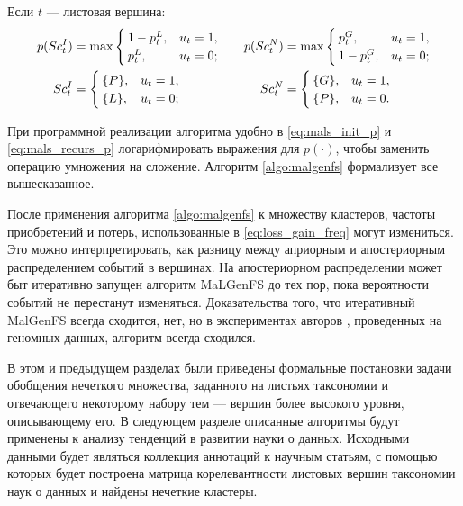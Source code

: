 \documentclass[12pt]{article}
\newenvironment{itemize*}%
{\begin{itemize}%
	\setlength{\itemsep}{0pt}%
	\setlength{\parskip}{0pt}}%
{\end{itemize}}
\begin{document}
\begin{itemize*}
 	\item Если $t$ --- листовая вершина:
 	\begin{equation}
 		\begin{aligned}
			p(Sc_t^I)&=\max\begin{cases}
			1-p_t^L, &u_t=1, \\
			p_t^L, &u_t=0;
			\end{cases}  \quad
			&p(Sc_t^N)&=\max\begin{cases}
			p_t^G, &u_t=1, \\
			1-p_t^G, &u_t=0;
			\end{cases} \\
			Sc_t^I&=\begin{cases}
				\{P\}, &u_t=1, \\
				\{L\}, &u_t=0;
			\end{cases} \quad
			&Sc_t^N&=\begin{cases}
				\{G\}, &u_t=1, \\
				\{P\}, &u_t=0.
			\end{cases}
		\end{aligned} 
		\label{eq:mals_init_p}
 	\end{equation}

 \end{itemize*}

При программной реализации алгоритма удобно в \eqref{eq:mals_init_p} и \eqref{eq:mals_recurs_p} логарифмировать выражения для $p(\cdot)$, чтобы заменить операцию умножения на сложение. Алгоритм \ref{algo:malgenfs} формализует все вышесказанное.

После применения алгоритма  \ref{algo:malgenfs} к множеству кластеров, частоты приобретений и потерь, использованные в  \eqref{eq:loss_gain_freq} могут измениться. Это можно интерпретировать, как разницу между априорным и апостериорным распределением событий в вершинах. На апостериорном распределении может быт итеративно запущен алгоритм MaLGenFS до тех пор, пока вероятности событий не перестанут изменяться. Доказательства того, что итеративный MalGenFS всегда сходится, нет, но в экспериментах авторов \cite{mirkin2006aggregating}, проведенных на геномных данных, алгоритм всегда сходился.

В этом и предыдущем разделах были приведены формальные постановки задачи обобщения нечеткого множества, заданного на листьях таксономии и отвечающего некоторому набору тем --- вершин более высокого уровня, описывающему его. В следующем разделе описанные алгоритмы будут применены к анализу тенденций в развитии науки о данных. Исходными данными будет являться коллекция аннотаций к научным статьям, с помощью которых будет построена матрица корелевантности листовых вершин таксономии наук о данных и найдены нечеткие кластеры.
\end{document}

